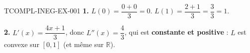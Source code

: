 \begin{corrige}{TCOMPL-INEG-EX-001}
\textbf{1.} $L(0) = \dfrac{0+0}{3} = 0$. $L(1) = \dfrac{2+1}{3} = \dfrac{3}{3} = 1$.

\textbf{2.} $L'(x) = \dfrac{4x+1}{3}$, donc $L''(x) = \dfrac{4}{3}$, qui est \textbf{constante et positive} : $L$ est convexe sur $[0,1]$ (et même sur $\mathbb{R}$).
\end{corrige}
